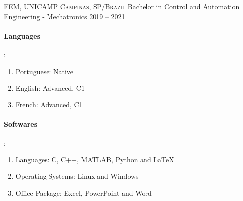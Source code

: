 \documentclass[10pt, a4paper]{article}
\begin{document}
\headedsection
    {\href{https://www.fem.unicamp.br/index.php/pt-br/}{FEM}, \href{https://www.unicamp.br/unicamp/universidade}{UNICAMP}}
    {\textsc{Campinas, SP/Brazil}}
    {
    \headedsubsection
        {Bachelor in Control and Automation Engineering - Mechatronics}
        {2019 -- 2021}
        {\bodytext{}}
    }

\spacedhrule{0.5em}{-0.4em}


\vspace{-1.3em}

\begin{multicols}{2}
    \paragraph{Languages}:
    \begin{enumerate}
        \item Portuguese: Native
        \item English: Advanced, C1
        \item French: Advanced, C1
    \end{enumerate}
    \columnbreak
    \paragraph{Softwares}:
    \begin{enumerate}
        \item Languages: C, C++, MATLAB, Python and LaTeX
        \item Operating Systems: Linux and Windows
        \item Office Package: Excel, PowerPoint and Word
    \end{enumerate}
\end{multicols}

\spacedhrule{1.6em}{-0.4em}
\end{document}
